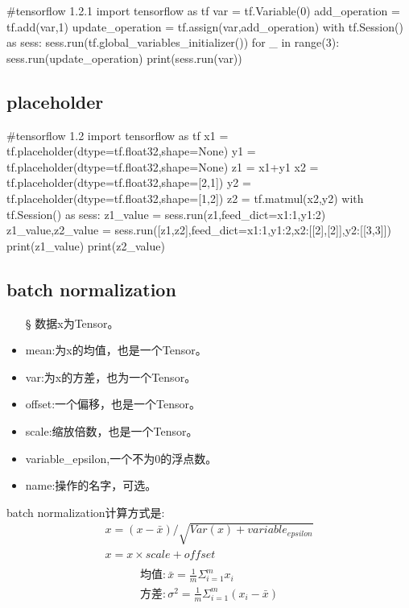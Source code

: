 \begin{python}
#tensorflow 1.2.1
import tensorflow as tf
var = tf.Variable(0)
add_operation = tf.add(var,1)
update_operation = tf.assign(var,add_operation)
with tf.Session() as sess:
    sess.run(tf.global_variables_initializer())
    for _ in range(3):
        sess.run(update_operation)
        print(sess.run(var))
\end{python}
\subsection{placeholder}
\begin{python}
#tensorflow 1.2
import tensorflow as tf
x1 = tf.placeholder(dtype=tf.float32,shape=None)
y1 = tf.placeholder(dtype=tf.float32,shape=None)
z1 = x1+y1
x2 = tf.placeholder(dtype=tf.float32,shape=[2,1])
y2 = tf.placeholder(dtype=tf.float32,shape=[1,2])
z2 = tf.matmul(x2,y2)
with tf.Session() as sess:
    z1_value = sess.run(z1,feed_dict={x1:1,y1:2})
    z1_value,z2_value = sess.run([z1,z2],feed_dict={x1:1,y1:2,x2:[[2],[2]],y2:[[3,3]]})
    print(z1_value)
    print(z2_value)
\end{python}
\subsection{batch normalization}

\begin{itemize}
	\item[\S] 数据x为Tensor。
\item mean:为x的均值，也是一个Tensor。
\item var:为x的方差，也为一个Tensor。
\item offset:一个偏移，也是一个Tensor。
\item scale:缩放倍数，也是一个Tensor。
\item variable\_epsilon,一个不为0的浮点数。
\item name:操作的名字，可选。
\end{itemize}
batch normalization计算方式是:
\begin{gather}
x = (x-\bar{x})/\sqrt{Var(x)+variable_{epsilon}}\\
x = x\times scale+offset\\
\end{gather}
\begin{gather}
\text{均值}:\bar{x} = \frac{1}{m}\Sigma_{i=1}^{m}x_i\\
\text{方差}:\sigma^2 = \frac{1}{m}\Sigma_{i=1}^m(x_i-\bar{x})
\end{gather}
